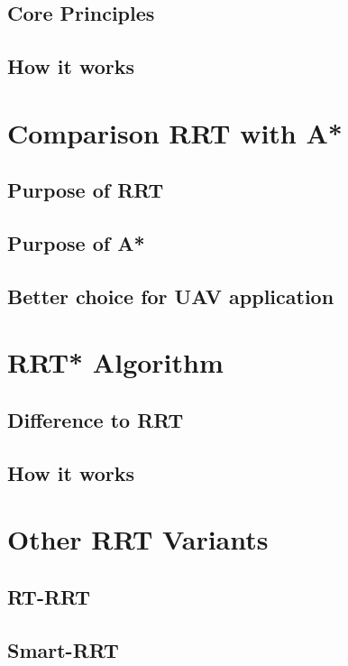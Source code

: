 \subsection{Core Principles}

\subsection{How it works}

\section{Comparison RRT with A*}

\subsection{Purpose of RRT}

\subsection{Purpose of A*}

\subsection{Better choice for UAV application}

\section{RRT* Algorithm}

\subsection{Difference to RRT}

\subsection{How it works}

\section{Other RRT Variants}

\subsection{RT-RRT}

\subsection{Smart-RRT}
